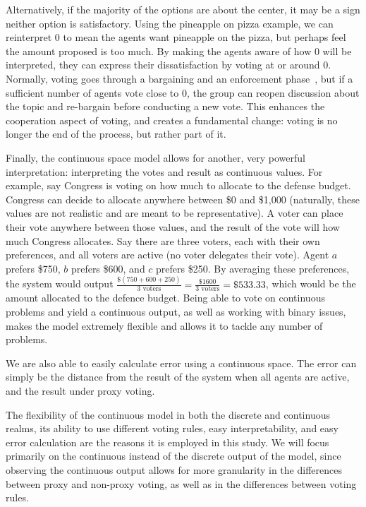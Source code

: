 Alternatively, if the majority of the options are about the center, it may be a sign
neither option is satisfactory.
Using the pineapple on pizza example, we can reinterpret 0 to mean the agents want
pineapple on the pizza, but perhaps feel the amount proposed is too much.
By making the agents aware of how 0 will be interpreted, they can express their
dissatisfaction by voting at or around 0.
Normally, voting goes through a bargaining and an enforcement
phase~\cite{Fearon1998}, but if a sufficient number of agents vote close to 0, the
group can reopen discussion about the topic and re-bargain before conducting a new vote.
This enhances the cooperation aspect of voting, and creates a fundamental change:
voting is no longer the end of the process, but rather part of it.

Finally, the continuous space model allows for another, very powerful interpretation:
interpreting the votes and result as continuous values.
For example, say Congress is voting on how much to allocate to the defense budget.
Congress can decide to allocate anywhere between \$0 and \$1,000 (naturally, these
values are not realistic and are meant to be representative).
A voter can place their vote anywhere between those values, and the result of the
vote will how much Congress allocates.
Say there are three voters, each with their own preferences, and all voters are
active (no voter delegates their vote).
Agent $a$ prefers \$750, $b$ prefers \$600, and $c$ prefers \$250.
By averaging these preferences, the system would output
$\frac{\$(750 + 600 + 250)}{3 \text{ voters}} = \frac{\$1600}{3 \text{ voters}} =
\$533.33$, which would be the amount allocated to the defence budget.
Being able to vote on continuous problems and yield a continuous output, as well as
working with binary issues, makes the model extremely flexible and allows it to
tackle any number of problems.

We are also able to easily calculate error using a continuous space.
The error can simply be the distance from the result of the system when all agents
are active, and the result under proxy voting.

The flexibility of the continuous model in both the discrete and continuous realms, its
ability to use different voting rules, easy interpretability, and easy error
calculation are the reasons it is employed in this study.
We will focus primarily on the continuous instead of the discrete output of the
model, since observing the continuous output allows for more granularity in the
differences between proxy and non-proxy voting, as well as in the differences between
voting rules.

